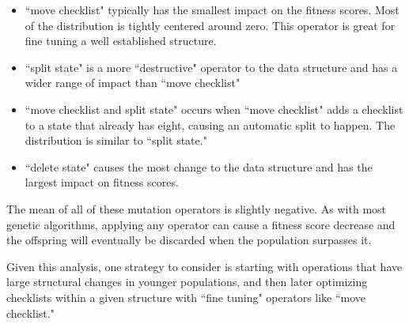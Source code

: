 \documentclass[3p,times,procedia]{elsarticle}
\begin{document}
\begin{itemize}
  \item ``move checklist" typically has the smallest impact on the fitness scores. Most of the distribution is tightly centered around zero. This operator is great for fine tuning a well established structure. 
  \item ``split state" is a more ``destructive" operator to the data structure and has a wider range of impact than ``move checklist"
  \item ``move checklist and split state" occurs when ``move checklist" adds a  checklist to a state that already has eight, causing an automatic split to happen. The distribution is similar to ``split state."
  \item ``delete state" causes the most change to the data structure and has the largest impact on fitness scores. 
\end{itemize}

The mean of all of these mutation operators is slightly negative. As with most genetic algorithms, applying any operator can cause a fitness score decrease and the offspring will eventually be discarded when the population surpasses it. 

Given this analysis, one strategy to consider is starting with operations that have large structural changes in younger populations, and then later optimizing checklists within a given structure with ``fine tuning" operators like ``move checklist."



\end{document}

